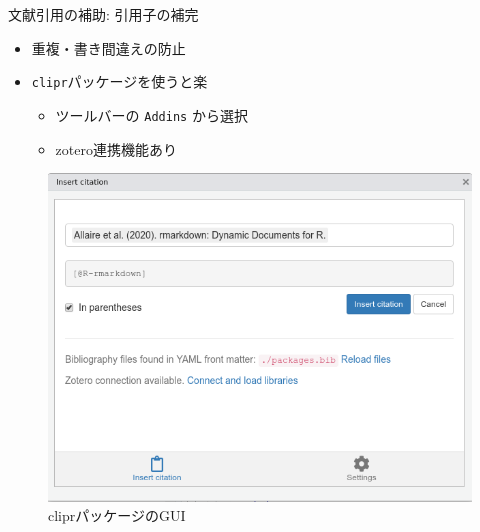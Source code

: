 \documentclass[14pt,ignorenonframetext,]{beamer}
\providecommand{\tightlist}{%
  \setlength{\itemsep}{0pt}\setlength{\parskip}{0pt}}
\begin{document}
\begin{frame}[fragile]{文献引用の補助: 引用子の補完}
\protect\hypertarget{ux6587ux732eux5f15ux7528ux306eux88dcux52a9-ux5f15ux7528ux5b50ux306eux88dcux5b8c}{}

\begin{itemize}
\tightlist
\item
  重複・書き間違えの防止
\item
  \texttt{clipr}パッケージを使うと楽

  \begin{itemize}
  \tightlist
  \item
    ツールバーの \texttt{Addins} から選択
  \item
    zotero連携機能あり
  \end{itemize}
\end{itemize}

\begin{figure}

{\centering \includegraphics[width=0.5\linewidth]{img/clipr} 

}

\caption{cliprパッケージのGUI}\label{fig:clipr-image}
\end{figure}

\end{frame}
\end{document}

